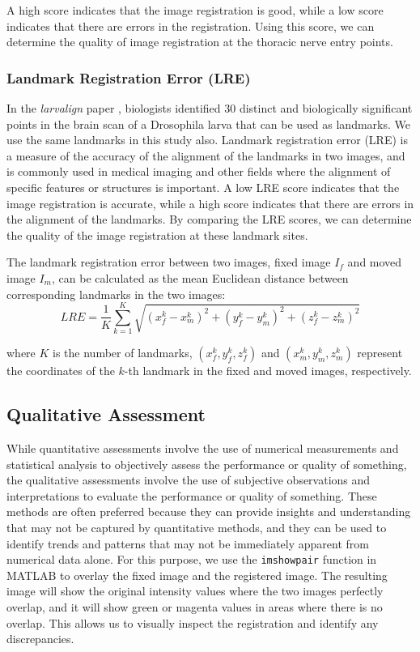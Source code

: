 \documentclass{book}
\begin{document}
	A high score indicates that the image registration is good, while a low score indicates that there are errors in the registration. Using this score, we can determine the quality of image registration at the thoracic nerve entry points.
	
	\subsubsection{Landmark Registration Error (LRE)}
	In the \textit{larvalign} paper \cite{larvalign}, biologists identified 30 distinct and biologically significant points in the brain scan of a Drosophila larva that can be used as landmarks. We use the same landmarks in this study also. Landmark registration error (LRE) is a measure of the accuracy of the alignment of the landmarks in two images, and is commonly used in medical imaging and other fields where the alignment of specific features or structures is important. A low LRE score indicates that the image registration is accurate, while a high score indicates that there are errors in the alignment of the landmarks. By comparing the LRE scores, we can determine the quality of the image registration at these landmark sites.
	
	The landmark registration error between two images, fixed image $I_f$ and moved image $I_m$, can be calculated as the mean Euclidean distance between corresponding landmarks in the two images:
	\begin{equation}\label{eqn:lre}
		LRE = \frac{1}{K} \sum_{k=1}^K \sqrt{(x_f^k - x_m^k)^2 + (y_f^k - y_m^k)^2 + (z_f^k - z_m^k)^2}
	\end{equation}
	
	where $K$ is the number of landmarks, $(x_f^k, y_f^k, z_f^k)$ and $(x_m^k, y_m^k, z_m^k)$ represent the coordinates of the $k$-th landmark in the fixed and moved images, respectively.
	
	\subsection{Qualitative Assessment}
	While quantitative assessments involve the use of numerical measurements and statistical analysis to objectively assess the performance or quality of something, the qualitative assessments involve the use of subjective observations and interpretations to evaluate the performance or quality of something. These methods are often preferred because they can provide insights and understanding that may not be captured by quantitative methods, and they can be used to identify trends and patterns that may not be immediately apparent from numerical data alone.
	For this purpose, we use the \texttt{imshowpair} function in MATLAB to overlay the fixed image and the registered image. The resulting image will show the original intensity values where the two images perfectly overlap, and it will show green or magenta values in areas where there is no overlap. This allows us to visually inspect the registration and identify any discrepancies.
	
\end{document}
